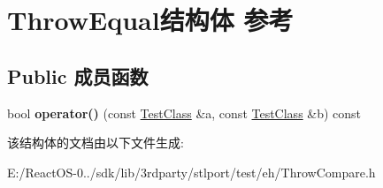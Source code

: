 \hypertarget{struct_throw_equal}{}\section{Throw\+Equal结构体 参考}
\label{struct_throw_equal}
\subsection*{Public 成员函数}
\begin{DoxyCompactItemize}
\item 
\mbox{\label{struct_throw_equal_a104e06935006ce5639a5015b703a9341}} 
bool {\bfseries operator()} (const \hyperlink{class_test_class}{Test\+Class} \&a, const \hyperlink{class_test_class}{Test\+Class} \&b) const
\end{DoxyCompactItemize}


该结构体的文档由以下文件生成\+:\begin{DoxyCompactItemize}
\item 
E\+:/\+React\+O\+S-\/0../sdk/lib/3rdparty/stlport/test/eh/Throw\+Compare.\+h\end{DoxyCompactItemize}
